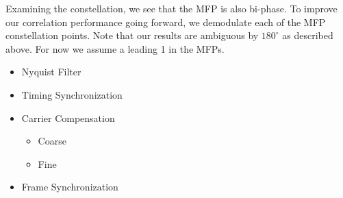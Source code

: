\documentclass[conference,onecolumn]{IEEEtran}
\begin{document}
Examining the constellation, we see that the MFP is also bi-phase. To 
improve our correlation performance going forward, we demodulate each of the MFP constellation points. Note that our results are ambiguous by $180^{\circ}$ as described above. For now we assume a leading 1 in the MFPs.



\begin{itemize}
	\item Nyquist Filter
	\item Timing Synchronization
	\item Carrier Compensation
	\begin{itemize}
		\item Coarse
		\item Fine
	\end{itemize}
	\item Frame Synchronization
\end{itemize}

\printbibliography

\end{document}
